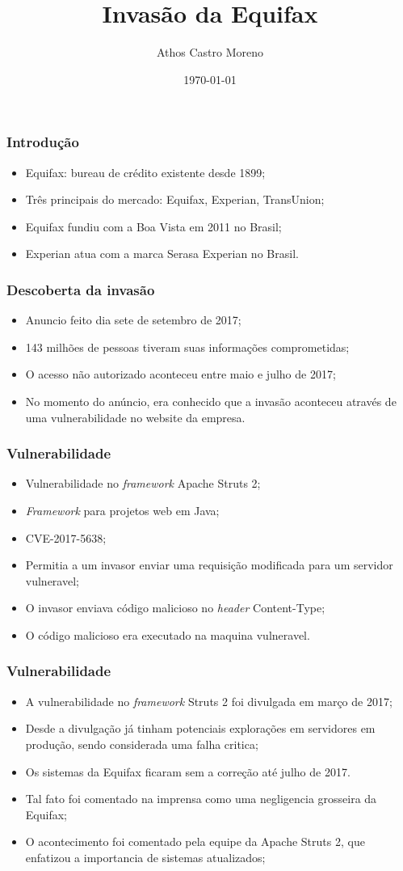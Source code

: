 \documentclass{beamer}
\title{Invasão da Equifax}
\author[Athos Castro Moreno]{Athos Castro Moreno}
\institute{Universidade Tecnológica Federal do Paraná}
\date{\today}
\begin{document}
	\begin{frame}
		\titlepage
	\end{frame}
	\begin{frame}
		\frametitle{Introdução}
		\begin{itemize}
			\item Equifax: bureau de crédito existente desde 1899;
			\item Três principais do mercado: Equifax, Experian, TransUnion;
			\item Equifax fundiu com a Boa Vista em 2011 no Brasil;
			\item Experian atua com a marca Serasa Experian no Brasil. 
		\end{itemize}
	\end{frame}
	\begin{frame}
		\frametitle{Descoberta da invasão}
		\begin{itemize}
			\item Anuncio feito dia sete de setembro de 2017;
			\item 143 milhões de pessoas tiveram suas informações comprometidas;
			\item O acesso não autorizado aconteceu entre maio e julho de 2017;
			\item No momento do anúncio, era conhecido que a invasão aconteceu através de uma vulnerabilidade no website da empresa.
		\end{itemize}
	\end{frame}
	\begin{frame}
		\frametitle{Vulnerabilidade}
		\begin{itemize}
			\item Vulnerabilidade no \textit{framework} Apache Struts 2;
			\item \textit{Framework} para projetos web em Java;
			\item CVE-2017-5638;
			\item Permitia a um invasor enviar uma requisição modificada para um servidor vulneravel;
			\item O invasor enviava código malicioso no \textit{header} Content-Type;
			\item O código malicioso era executado na maquina vulneravel.
		\end{itemize}
	\end{frame}
	\begin{frame}
		\frametitle{Vulnerabilidade}
		\begin{itemize}
			\item A vulnerabilidade no \textit{framework} Struts 2 foi divulgada em março de 2017;
			\item Desde a divulgação já tinham potenciais explorações em servidores em produção, sendo considerada uma falha critica;
			\item Os sistemas da Equifax ficaram sem a correção até julho de 2017.
			\item Tal fato foi comentado na imprensa como uma negligencia grosseira da Equifax;
			\item O acontecimento foi comentado pela equipe da Apache Struts 2, que enfatizou a importancia de sistemas atualizados;
		\end{itemize}
	\end{frame}
	\begin{frame}
		\titlepage
	\end{frame}
\end{document}
